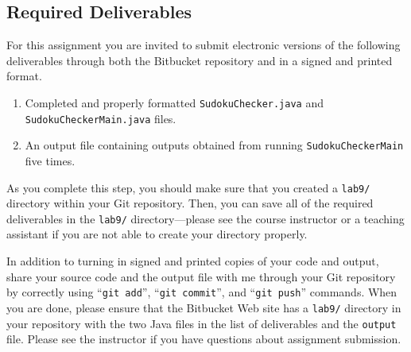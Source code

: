\vspace{-0.05in}
\vspace{-0.2in}
\subsection*{Required Deliverables}
\vspace{-0.05in}

For this assignment you are invited to submit electronic versions of the following deliverables through both the Bitbucket
repository and in a signed and printed format.

\vspace{-0.05in}
\begin{enumerate}
    \setlength{\itemsep}{0pt}
  \item Completed and properly formatted {\tt SudokuChecker.java} and {\tt SudokuCheckerMain.java} files.

  \item An output file containing outputs obtained from running {\tt SudokuCheckerMain} five times.
        
\end{enumerate}
\vspace{-0.05in}

\noindent As you complete this step, you should make sure that you created a {\tt lab9/} directory within your Git
repository.  Then, you can save all of the required deliverables in the {\tt lab9/} directory---please see the course
instructor or a teaching assistant if you are not able to create your directory properly. 

\noindent In addition to turning in signed and printed copies of your code and output, share your source code and the output
file with me through your Git repository by correctly using ``{\tt git add}'', ``{\tt git commit}'', and ``{\tt git
  push}'' commands. When you are done, please ensure that the Bitbucket Web site has a {\tt lab9/} directory in your
repository with the two Java files in the list of deliverables and the {\tt output} file. Please see the instructor
if you have questions about assignment submission.


